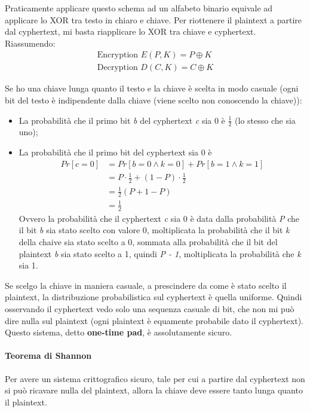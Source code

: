 \noindent Praticamente applicare questo schema ad un alfabeto binario equivale ad applicare lo XOR tra testo in chiaro e chiave. Per riottenere il plaintext a partire dal cyphertext, mi basta riapplicare lo XOR tra chiave e cyphertext. Riassumendo:
\begin{align*}
    \text{Encryption } E(P, K) = P  \oplus K\\
    \text{Decryption } D(C, K) = C  \oplus K
\end{align*}

\noindent Se ho una chiave lunga quanto il testo e la chiave è scelta in modo casuale (ogni bit del testo è indipendente dalla chiave (viene scelto non conoscendo la chiave)):
\begin{itemize}
    \item La probabilità che il primo bit \textit{b} del cyphertext \textit{c} sia 0 è $\frac{1}{2}$ (lo stesso che sia uno);
    \item La probabilità che il primo bit del cyphertext sia 0 è
        \begin{align*}
            Pr[c = 0] &= Pr[b = 0 \land k = 0] + Pr[b = 1 \land k = 1]\\
                    &= P \cdot \frac{1}{2} + (1-P) \cdot \frac{1}{2}\\
                    &= \frac{1}{2} (P+1-P)\\
                    &= \frac{1}{2}
        \end{align*}
    \noindent Ovvero la probabilità che il cyphertext \textit{c} sia 0 è data dalla probabilità \textit{P} che il bit \textit{b} sia stato scelto con valore 0, moltiplicata la probabilità che il bit \textit{k} della chaive sia stato scelto a 0, sommata alla probabilità che il bit del plaintext \textit{b} sia stato scelto a 1, quindi \textit{P - 1}, moltiplicata la probabilità che \textit{k} sia 1.
\end{itemize}

\noindent Se scelgo la chiave in maniera casuale, a prescindere da come è stato scelto il plaintext, la distribuzione probabilistica sul cyphertext è quella uniforme. Quindi osservando il cyphertext vedo solo una sequenza casuale di bit, che non mi può dire nulla sul plaintext (ogni plaintext è equamente probabile dato il cyphertext). Questo sistema, detto \textbf{one-time pad}, è assolutamente sicuro.

\paragraph{Teorema di Shannon} Per avere un sistema crittografico sicuro, tale per cui a partire dal cyphertext non si può ricavare nulla del plaintext, allora la chiave deve essere tanto lunga quanto il plaintext. 

